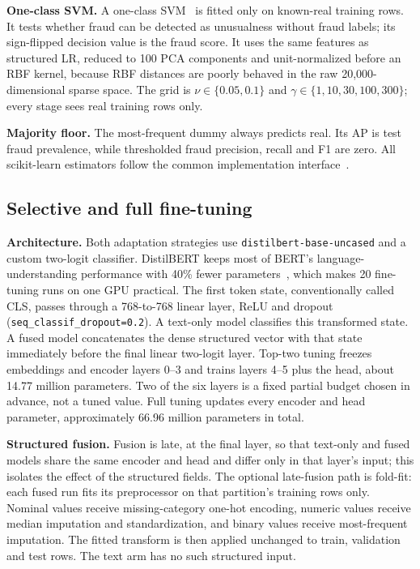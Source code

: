 \textbf{One-class SVM.} A one-class SVM~\cite{scholkopf2001} is fitted only on known-real training
rows. It tests whether fraud can be detected as unusualness without fraud labels; its sign-flipped
decision value is the fraud score. It uses the same features as structured LR, reduced to 100 PCA
components and unit-normalized before an RBF kernel, because RBF distances are poorly behaved in the
raw 20,000-dimensional sparse space. The grid is
$\nu\in\{0.05,0.1\}$ and $\gamma\in\{1,10,30,100,300\}$; every stage sees real training rows only.

\textbf{Majority floor.} The most-frequent dummy always predicts real. Its AP is test fraud
prevalence, while thresholded fraud precision, recall and F1 are zero. All scikit-learn estimators
follow the common implementation interface~\cite{pedregosa2011}.

\subsection{Selective and full fine-tuning}

\textbf{Architecture.} Both adaptation strategies use \texttt{distilbert-base-uncased} and a custom
two-logit classifier. DistilBERT keeps most of BERT's language-understanding performance with 40\%
fewer parameters~\cite{sanh2019}, which makes 20 fine-tuning runs on one GPU practical. The first token state, conventionally called CLS, passes through a 768-to-768
linear layer, ReLU and dropout (\texttt{seq\_classif\_dropout=0.2}). A text-only model classifies
this transformed state. A fused model concatenates the dense structured vector with that state
immediately before the final linear two-logit layer. Top-two tuning freezes embeddings and encoder
layers 0--3 and trains layers 4--5 plus the head, about 14.77 million parameters. Two of the six
layers is a fixed partial budget chosen in advance, not a tuned value. Full tuning updates
every encoder and head parameter, approximately 66.96 million parameters in total.

\textbf{Structured fusion.} Fusion is late, at the final layer, so that text-only and fused models
share the same encoder and head and differ only in that layer's input; this isolates the effect of
the structured fields. The optional late-fusion path is fold-fit: each fused run fits its
preprocessor on that partition's training rows only. Nominal values receive missing-category one-hot
encoding, numeric values receive median imputation and standardization, and binary values receive
most-frequent imputation. The fitted transform is then applied unchanged to train, validation and
test rows. The text arm has no such structured input.

